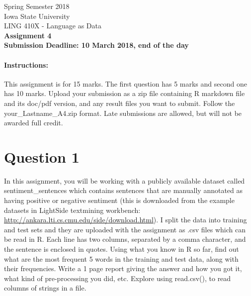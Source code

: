 \documentclass[11pt,a4paper]{article}
\begin{document}
\begin{center}
  Spring Semester 2018 \\ Iowa State University\\[3ex]
  {\large LING 410X - Language as Data}\\[3ex]
  \textbf{Assignment 4} \\ \textbf{Submission Deadline: 10 March 2018, end of the day}
\end{center}


\paragraph{Instructions:} This assignment is for 15 marks. The first question has 5 marks and second one has 10 marks. Upload your submission as a zip file containing R markdown file and its doc/pdf version, and any result files you want to submit. Follow the your\_Lastname\_A4.zip format. Late submissions are allowed, but will not be awarded full credit. 

\section*{Question 1} 
In this assignment, you will be working with a publicly available dataset called sentiment\_sentences which contains sentences that are manually annotated as having positive or negative sentiment (this is downloaded from the example datasets in LightSide textmining workbench: \url{http://ankara.lti.cs.cmu.edu/side/download.html}). I split the data into training and test sets and they are uploaded with the assignment as .csv files which can be read in R. Each line has two columns, separated by a comma character, and the sentence is enclosed in quotes. Using what you know in R so far, find out what are the most frequent 5 words in the training and test data, along with their frequencies. Write a 1 page report giving the answer and how you got it, what kind of pre-processing you did, etc. Explore using read.csv(), to read columns of strings in a file.
\end{document}
